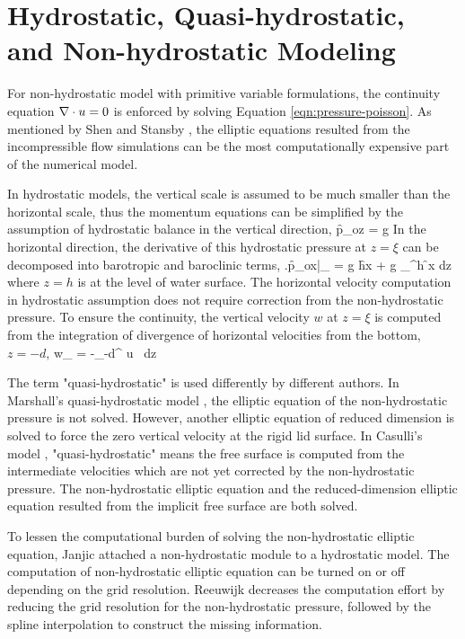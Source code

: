 \normalsize
\section{Hydrostatic, Quasi-hydrostatic, and Non-hydrostatic Modeling}

For non-hydrostatic model with primitive variable formulations, the continuity equation $\nabla \cdot u = 0$ is enforced by solving Equation \ref{eqn:pressure-poisson}. As mentioned by Shen\cite{Shen04} and Stansby \cite{Stansby1998}, the elliptic equations resulted from the incompressible flow simulations can be the most computationally expensive part of the numerical model.

In hydrostatic models, the vertical scale is assumed to be much smaller than the horizontal scale, thus the momentum equations can be simplified by the assumption of hydrostatic balance in the vertical direction,
\be
\f{\p p_o}{\p z} = \rho g
\ee
In the horizontal direction, the derivative of this hydrostatic pressure at $z=\xi$ can be decomposed into barotropic and baroclinic terms,
\be
\left.\f{\p p_o}{\p x}\right|_{\xi} = \rho g \f{\p h}{\p x} + g \int_{\xi}^h \f{\p \rho}{\p x} dz
\ee
where $z=h$ is at the level of water surface. The horizontal velocity computation in hydrostatic assumption does not require correction from the non-hydrostatic pressure.
To ensure the continuity, the vertical velocity $w$ at $z=\xi$ is computed from the integration of divergence of horizontal velocities from the bottom, $z=-d$,
\be
w_{\xi} = -\int_{-d}^{\xi} \di u \ dz
\label{eqn:w-correction-hydrostatic}
\ee

The term "quasi-hydrostatic" is used differently by different authors. In Marshall's quasi-hydrostatic model \cite{Marshall1997}, the elliptic equation of the non-hydrostatic pressure is not solved. However, another elliptic equation of reduced dimension is solved to force the zero vertical velocity at the rigid lid surface. In Casulli's model \cite{Casulli1998}, "quasi-hydrostatic" means the free surface is computed from the intermediate velocities which are not yet corrected by the non-hydrostatic pressure. The non-hydrostatic elliptic equation and the reduced-dimension elliptic equation resulted from the implicit free surface are both solved.

To lessen the computational burden of solving the non-hydrostatic elliptic equation, Janjic \cite{Janjic01} attached a non-hydrostatic module to a hydrostatic model. The computation of non-hydrostatic elliptic equation can be turned on or off depending on the grid resolution. Reeuwijk \cite{Reeuwijk02} decreases the computation effort by reducing the grid resolution for the non-hydrostatic pressure, followed by the spline interpolation to construct the missing information. 